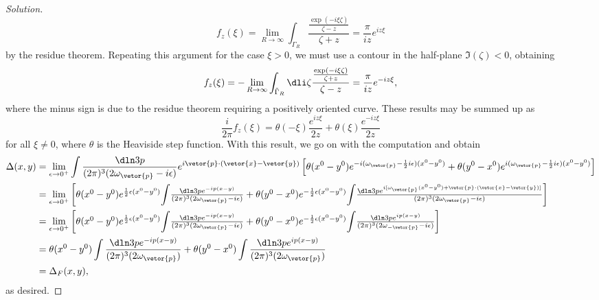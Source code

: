 \begin{proof}[Solution]
\begin{equation*}
      f_z(\xi) = \lim_{R \to \infty} \int_{\Gamma_R} \frac{\frac{\exp(-i \xi \zeta)}{\zeta - z}}{\zeta + z} = \frac{\pi}{iz} e^{i z \xi}
   \end{equation*}
   by the residue theorem. Repeating this argument for the case \(\xi > 0\), we must use a contour in the half-plane \(\Im(\zeta) < 0\), obtaining
   \begin{equation*}
      f_z(\xi) = - \lim_{R \to \infty} \int_{\tilde{\Gamma}_R}\dli\zeta \frac{\frac{\exp(-i \xi \zeta)}{\zeta + z}}{\zeta - z} = \frac{\pi}{iz}e^{-iz \xi},
   \end{equation*}
   where the minus sign is due to the residue theorem requiring a positively oriented curve. These results may be summed up as
   \begin{equation*}
      \frac{i}{2\pi} f_z(\xi) = \theta(-\xi) \frac{e^{iz \xi}}{2z} + \theta(\xi) \frac{e^{-iz\xi}}{2z}
   \end{equation*}
   for all \(\xi \neq 0\), where \(\theta\) is the Heaviside step function. With this result, we go on with the computation and obtain
   \begin{align*}
      \Delta(x,y)
      &= \lim_{\epsilon \to 0^+} \int \frac{\dln3p}{(2\pi)^3 (2 \omega_{\vetor{p}} - i \epsilon)} e^{i \vetor{p} \cdot (\vetor{x} - \vetor{y})} \left[\theta(x^0 - y^0) e^{-i (\omega_{\vetor{p}} - \frac12 i \epsilon) (x^0 - y^0)} + \theta(y^0 - x^0) e^{i (\omega_{\vetor{p}} - \frac12 i \epsilon)(x^0 - y^0)}\right]\\
      &= \lim_{\epsilon\to0^+}\textstyle\left[\theta(x^0 - y^0) e^{\frac12 \epsilon (x^0 - y^0)}{\displaystyle\int}\frac{\dln3p e^{-i p (x - y)}}{(2\pi)^3(2 \omega_{\vetor{p}}- i \epsilon)}  + \theta(y^0 - x^0) e^{-\frac12 \epsilon (x^0 - y^0)} {\displaystyle\int}\frac{\dln3p e^{i[\omega_{\vetor{p}}(x^0 - y^0) + \vetor{p}\cdot (\vetor{x} - \vetor{y})]}}{(2\pi)^3(2 \omega_{\vetor{p}} - i \epsilon)}\right]\\
      &= \lim_{\epsilon\to0^+}\textstyle\left[\theta(x^0 - y^0) e^{\frac12 \epsilon (x^0 - y^0)}{\displaystyle\int}\frac{\dln3p e^{-i p (x - y)}}{(2\pi)^3(2 \omega_{\vetor{p}}- i \epsilon)}  + \theta(y^0 - x^0) e^{-\frac12 \epsilon (x^0 - y^0)} {\displaystyle\int}\frac{\dln3p e^{i p (x - y)}}{(2\pi)^3(2 \omega_{-\vetor{p}} - i \epsilon)}\right]\\
      &= \theta(x^0 - y^0) \int \frac{\dln3p e^{-ip(x - y)}}{(2\pi)^3(2\omega_{\vetor{p}})} + \theta(y^0 - x^0) \int \frac{\dln3p e^{ip(x - y)}}{(2\pi)^3(2\omega_{\vetor{p}})}\\
      &= \Delta_F(x,y),
   \end{align*}
   as desired.
\end{proof}
